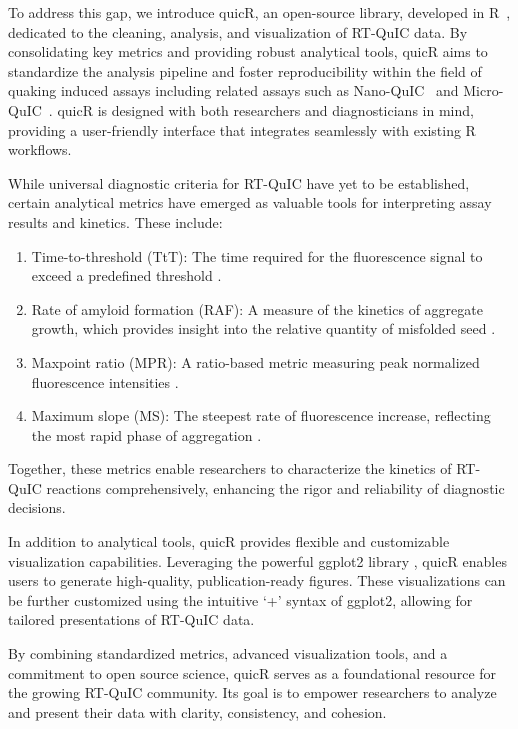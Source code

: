 \documentclass[preprint,12pt, a4paper]{elsarticle}
\begin{document}
    To address this gap, we introduce quicR, an open-source library, developed in R~\cite{R2024}, dedicated to the cleaning, analysis, and visualization of RT-QuIC data. By consolidating key metrics and providing robust analytical tools, quicR aims to standardize the analysis pipeline and foster reproducibility within the field of quaking induced assays including related assays such as Nano-QuIC~\cite{Christenson2023} and Micro-QuIC~\cite{Lee2024}. quicR is designed with both researchers and diagnosticians in mind, providing a user-friendly interface that integrates seamlessly with existing R workflows.

    While universal diagnostic criteria for RT-QuIC have yet to be established, certain analytical metrics have emerged as valuable tools for interpreting assay results and kinetics. These include:

    \begin{enumerate}
        \item Time-to-threshold (TtT): The time required for the fluorescence signal to exceed a predefined threshold \cite{Orru2015}.
        \item Rate of amyloid formation (RAF): A measure of the kinetics of aggregate growth, which provides insight into the relative quantity of misfolded seed \cite{Gallups2022}.
        \item Maxpoint ratio (MPR): A ratio-based metric measuring peak normalized fluorescence intensities \cite{Rowden2023}.
        \item Maximum slope (MS): The steepest rate of fluorescence increase, reflecting the most rapid phase of aggregation \cite{Henderson2015}.
    \end{enumerate}

    Together, these metrics enable researchers to characterize the kinetics of RT-QuIC reactions comprehensively, enhancing the rigor and reliability of diagnostic decisions.

    In addition to analytical tools, quicR provides flexible and customizable visualization capabilities. Leveraging the powerful ggplot2 library \cite{ggplot2016}, quicR enables users to generate high-quality, publication-ready figures. These visualizations can be further customized using the intuitive `+' syntax of ggplot2, allowing for tailored presentations of RT-QuIC data.

    By combining standardized metrics, advanced visualization tools, and a commitment to open source science, quicR serves as a foundational resource for the growing RT-QuIC community. Its goal is to empower researchers to analyze and present their data with clarity, consistency, and cohesion.
\end{document}
